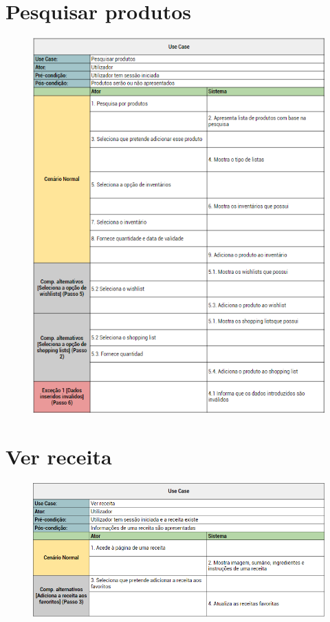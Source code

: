 \documentclass[a4paper]{report}
\begin{document}
    \section{Pesquisar produtos}
        \begin{figure}[H]
        \centering
            \includegraphics[width=\textwidth]{images/usecases/pesquisar_produto.png}
        \end{figure}

    \section{Ver receita}
        \begin{figure}[H]
        \centering
            \includegraphics[width=\textwidth]{images/usecases/ver_receita.png}
        \end{figure}
\end{document}
